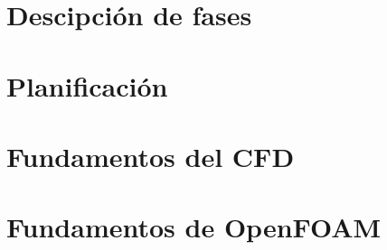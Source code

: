 \label{ch:meotodologia}


\section{Descipción de fases}\label{sec:fases}
\section{Planificación}\label{sec:planificacion}
\section{Fundamentos del CFD}\label{sec:cfd}
\section{Fundamentos de OpenFOAM}\label{sec:openfoam}
